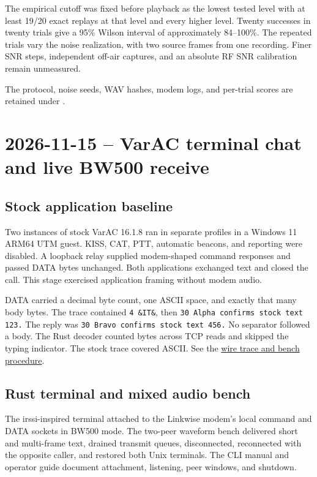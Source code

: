 \documentclass[11pt,a4paper]{article}
\newcommand{\pathtext}[1]{\path{#1}}
\begin{document}
The empirical cutoff was fixed before playback as the lowest tested
level with at least 19/20 exact replays at that level and every higher
level. Twenty successes in twenty trials give a 95\% Wilson interval
of approximately 84--100\%. The repeated trials vary the noise
realization, with two source frames from one recording. Finer SNR
steps, independent off-air captures, and an absolute RF SNR
calibration remain unmeasured.

The protocol, noise seeds, WAV hashes, modem logs, and per-trial
scores are retained under \pathtext{2026-11-15-main-retest.sajUbP/snr-sweep}.



\clearpage
\section{2026-11-15 -- VarAC terminal chat and live BW500 receive}
\label{sec:varac-chat-20261115}

\subsection{Stock application baseline}
Two instances of stock VarAC 16.1.8 ran in separate profiles in a Windows 11
ARM64 UTM guest. KISS, CAT, PTT, automatic beacons, and reporting were
disabled. A loopback relay supplied modem-shaped command responses and
passed DATA bytes unchanged. Both applications exchanged text and closed
the call. This stage exercised application framing without modem audio.

DATA carried a decimal byte count, one ASCII space, and exactly that many
body bytes. The trace contained \texttt{4 \&IT\&}, then \texttt{30 Alpha confirms stock text 123.} The reply was \texttt{30 Bravo confirms stock text 456.} No separator
followed a body. The Rust decoder counted bytes across TCP reads and
skipped the typing indicator. The stock trace covered ASCII. See the
\href{../docs/testing/varac-chat.md}{wire trace and bench procedure}.

\subsection{Rust terminal and mixed audio bench}
The irssi-inspired terminal attached to the Linkwise modem's local command
and DATA sockets in BW500 mode. The two-peer waveform bench delivered short
and multi-frame text, drained transmit queues, disconnected, reconnected
with the opposite caller, and restored both Unix terminals. The CLI manual
and operator guide document attachment, listening, peer windows, and shutdown.
\end{document}
